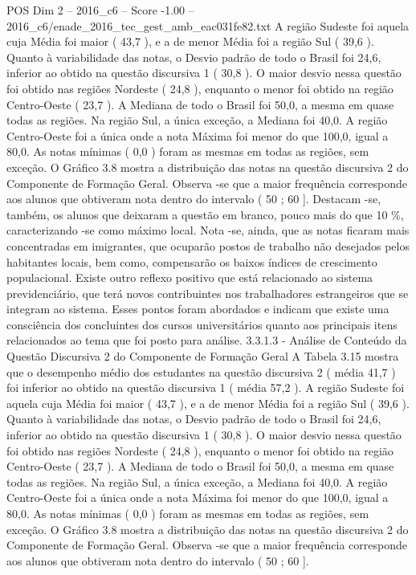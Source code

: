 \begin{textsample}{POS Dim 2 – 2016\_c6 – Score -1.00 – 2016\_c6/enade\_2016\_tec\_gest\_amb\_eac031fe82.txt}
A região Sudeste foi aquela cuja Média foi maior ( 43,7 ), e a de menor Média foi a região Sul ( 39,6 ).
Quanto à variabilidade das notas, o Desvio padrão de todo o Brasil foi 24,6, inferior ao obtido na questão discursiva 1 ( 30,8 ).
O maior desvio nessa questão foi obtido nas regiões Nordeste ( 24,8 ), enquanto o menor foi obtido na região Centro-Oeste ( 23,7 ).
A Mediana de todo o Brasil foi 50,0, a mesma em quase todas as regiões.
Na região Sul, a única exceção, a Mediana foi 40,0.
A região Centro-Oeste foi a única onde a nota Máxima foi menor do que 100,0, igual a 80,0.
As notas mínimas ( 0,0 ) foram as mesmas em todas as regiões, sem exceção.
O Gráfico 3.8 mostra a distribuição das notas na questão discursiva 2 do Componente de Formação Geral.
Observa -se que a maior frequência corresponde aos alunos que obtiveram nota dentro do intervalo ( 50 ; 60 ].
Destacam -se, também, os alunos que deixaram a questão em branco, pouco mais do que 10 \%, caracterizando -se como máximo local.
Nota -se, ainda, que as notas ficaram mais concentradas em imigrantes, que ocuparão postos de trabalho não desejados pelos habitantes locais, bem como, compensarão os baixos índices de crescimento populacional.
Existe outro reflexo positivo que está relacionado ao sistema previdenciário, que terá novos contribuintes nos trabalhadores estrangeiros que se integram ao sistema.
Esses pontos foram abordados e indicam que existe uma consciência dos concluintes dos cursos universitários quanto aos principais itens relacionados ao tema que foi posto para análise. 3.3.1.3 - Análise de Conteúdo da Questão Discursiva 2 do Componente de Formação Geral A Tabela 3.15 mostra que o desempenho médio dos estudantes na questão discursiva 2 ( média 41,7 ) foi inferior ao obtido na questão discursiva 1 ( média 57,2 ).
A região Sudeste foi aquela cuja Média foi maior ( 43,7 ), e a de menor Média foi a região Sul ( 39,6 ).
Quanto à variabilidade das notas, o Desvio padrão de todo o Brasil foi 24,6, inferior ao obtido na questão discursiva 1 ( 30,8 ).
O maior desvio nessa questão foi obtido nas regiões Nordeste ( 24,8 ), enquanto o menor foi obtido na região Centro-Oeste ( 23,7 ).
A Mediana de todo o Brasil foi 50,0, a mesma em quase todas as regiões.
Na região Sul, a única exceção, a Mediana foi 40,0.
A região Centro-Oeste foi a única onde a nota Máxima foi menor do que 100,0, igual a 80,0.
As notas mínimas ( 0,0 ) foram as mesmas em todas as regiões, sem exceção.
O Gráfico 3.8 mostra a distribuição das notas na questão discursiva 2 do Componente de Formação Geral.
Observa -se que a maior frequência corresponde aos alunos que obtiveram nota dentro do intervalo ( 50 ; 60 ].

\end{textsample}

